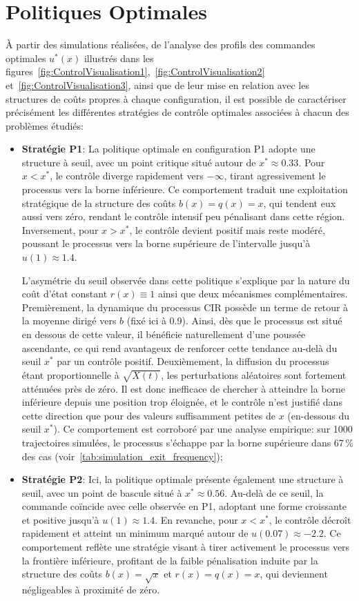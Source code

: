 \section{Politiques Optimales}
À partir des simulations réalisées, de l'analyse des profils des commandes optimales \( u^*(x) \) illustrés dans les figures~\ref{fig:ControlVisualisation1},~\ref{fig:ControlVisualisation2} et~\ref{fig:ControlVisualisation3}, ainsi que de leur mise en relation avec les structures de coûts propres à chaque configuration, il est possible de caractériser précisément les différentes stratégies de contrôle optimales associées à chacun des problèmes étudiés:
\begin{itemize}
    \item \textbf{Stratégie P1}: La politique optimale en configuration P1 adopte une structure à seuil, avec un point critique situé autour de \(x^* \approx 0.33\). Pour \(x < x^*\), le contrôle diverge rapidement vers \(-\infty\), tirant agressivement le processus vers la borne inférieure. Ce comportement traduit une exploitation stratégique de la structure des coûts \(b(x) = q(x) = x\), qui tendent eux aussi vers zéro, rendant le contrôle intensif peu pénalisant dans cette région. Inversement, pour \(x > x^*\), le contrôle devient positif mais reste modéré, poussant le processus vers la borne supérieure de l'intervalle jusqu'à \(u(1)\approx1.4\).

    L'asymétrie du seuil observée dans cette politique s'explique par la nature du coût d'état constant \(r(x)\equiv1\) ainsi que deux mécanismes complémentaires. Premièrement, la dynamique du processus \acs{CIR} possède un terme de retour à la moyenne dirigé vers \(b\) (fixé ici à 0.9). Ainsi, dès que le processus est situé en dessous de cette valeur, il bénéficie naturellement d'une poussée ascendante, ce qui rend avantageux de renforcer cette tendance au-delà du seuil \(x^*\) par un contrôle positif. Deuxièmement, la diffusion du processus étant proportionnelle à \(\sqrt{X(t)}\), les perturbations aléatoires sont fortement atténuées près de zéro. Il est donc inefficace de chercher à atteindre la borne inférieure depuis une position trop éloignée, et le contrôle n'est justifié dans cette direction que pour des valeurs suffisamment petites de \(x\) (en-dessous du seuil $x^*$). Ce comportement est corroboré par une analyse empirique: sur 1000 trajectoires simulées, le processus s'échappe par la borne supérieure dans 67\,\% des cas (voir~\ref{tab:simulation_exit_frequency});
    \item \textbf{Stratégie P2}: Ici, la politique optimale présente également une structure à seuil, avec un point de bascule situé à \( x^* \approx 0.56 \). Au-delà de ce seuil, la commande coïncide avec celle observée en P1, adoptant une forme croissante et positive jusqu'à \(u(1)\approx1.4\). En revanche, pour \( x < x^* \), le contrôle décroît rapidement et atteint un minimum marqué autour de \( u(0.07) \approx -2.2 \). Ce comportement reflète une stratégie visant à tirer activement le processus vers la frontière inférieure, profitant de la faible pénalisation induite par la structure des coûts \( b(x) = \sqrt{x} \) et \( r(x) = q(x) = x \), qui deviennent négligeables à proximité de zéro.
    

\end{itemize}
